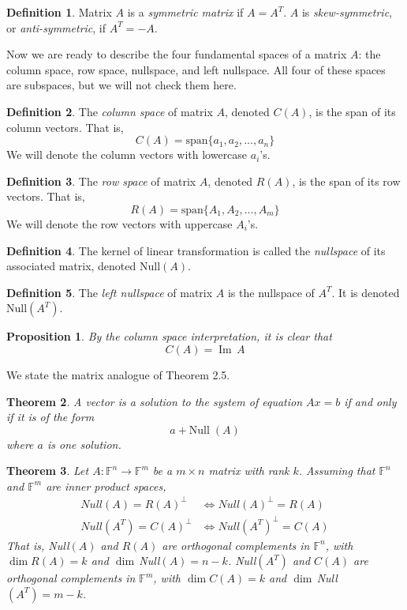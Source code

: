 \documentclass{article}
\DeclareMathOperator{\im}{Im}
\newtheorem{theorem}{Theorem}[section]
\newtheorem{proposition}[theorem]{Proposition}
\theoremstyle{remark}
\theoremstyle{definition}
\newtheorem{definition}{Definition}[section]
\begin{document}
    \begin{definition}
    Matrix $A$ is a \textit{symmetric matrix} if $A = A^T$. $A$ is \textit{skew-symmetric}, or \textit{anti-symmetric}, if $A^T = - A$. 
    \end{definition}

    Now we are ready to describe the four fundamental spaces of a matrix $A$: the column space, row space, nullspace, and left nullspace. All four of these spaces are subspaces, but we will not check them here. 

    \begin{definition}
    The \textit{column space} of matrix $A$, denoted $C(A)$, is the span of its column vectors. That is, 
    \[C(A) = \text{span}\{ a_1, a_2, ..., a_n\}\]
    We will denote the column vectors with lowercase $a_i$'s.
    \end{definition}

    \begin{definition}
    The \textit{row space} of matrix $A$, denoted $R(A)$, is the span of its row vectors. That is, 
    \[R(A) = \text{span}\{ A_1, A_2, ..., A_m\}\]
    We will denote the row vectors with uppercase $A_i$'s. 
    \end{definition}

    \begin{definition}
    The kernel of linear transformation is called the \textit{nullspace} of its associated matrix, denoted Null$(A)$. 
    \end{definition}

    \begin{definition}
    The \textit{left nullspace} of matrix $A$ is the nullspace of $A^T$. It is denoted Null$(A^T)$. 
    \end{definition}

    \begin{proposition}
    By the column space interpretation, it is clear that
    \[C(A) = \im \, A\]
    \end{proposition}

    We state the matrix analogue of Theorem 2.5. 
    \begin{theorem}
    A vector is a solution to the system of equation $A x = b$ if and only if it is of the form 
    \[ a + \text{Null}\; (A)\]
    where $a$ is one solution. 
    \end{theorem}

    \begin{theorem}
    Let $A: \mathbb{F}^n \longrightarrow \mathbb{F}^m$ be a $m \times n$ matrix with rank $k$. Assuming that $\mathbb{F}^n$ and $\mathbb{F}^m$ are inner product spaces,  
    \begin{align}
        Null(A) = R(A)^\perp &\iff Null(A)^\perp = R(A) \\
        Null(A^T) = C(A)^\perp &\iff Null(A^T)^\perp = C(A)
    \end{align}
    That is, Null$(A)$ and $R(A)$ are orthogonal complements in $\mathbb{F}^n$, with $\dim R(A) = k$ and $\dim\,$Null$(A) = n - k$. Null$(A^T)$ and $C(A)$ are orthogonal complements in $\mathbb{F}^m$, with $\dim C(A) = k$ and $\dim \,$Null$(A^T) = m - k$. 
    \end{theorem}
\end{document}
